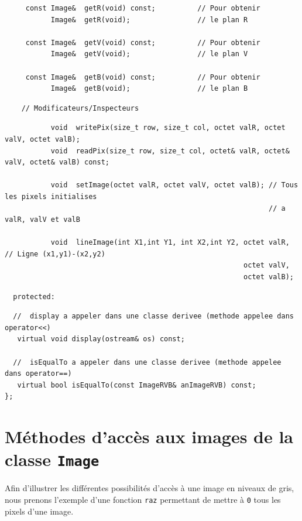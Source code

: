 \documentclass[12pt]{article}
\begin{document}
\begin{footnotesize}
\begin{verbatim}
     const Image&  getR(void) const;          // Pour obtenir
           Image&  getR(void);                // le plan R

     const Image&  getV(void) const;          // Pour obtenir
           Image&  getV(void);                // le plan V

     const Image&  getB(void) const;          // Pour obtenir
           Image&  getB(void);                // le plan B
\end{verbatim}
\vspace{-0.2cm}
\begin{verbatim}
    // Modificateurs/Inspecteurs
\end{verbatim}
\vspace{-0.2cm}
\begin{verbatim}
           void  writePix(size_t row, size_t col, octet valR, octet valV, octet valB);
           void  readPix(size_t row, size_t col, octet& valR, octet& valV, octet& valB) const;

           void  setImage(octet valR, octet valV, octet valB); // Tous les pixels initialises
                                                               // a valR, valV et valB

           void  lineImage(int X1,int Y1, int X2,int Y2, octet valR, // Ligne (x1,y1)-(x2,y2)
                                                         octet valV,
                                                         octet valB);
\end{verbatim}
\vspace{-0.2cm}
\begin{verbatim}
  protected:
\end{verbatim}
\vspace{-0.2cm}
\begin{verbatim}
  //  display a appeler dans une classe derivee (methode appelee dans operator<<)
   virtual void display(ostream& os) const;

  //  isEqualTo a appeler dans une classe derivee (methode appelee dans operator==)
   virtual bool isEqualTo(const ImageRVB& anImageRVB) const;
};
\end{verbatim}
\end{footnotesize}

\section{M\'ethodes d'acc\`es aux images de la classe {\tt Image}}

Afin d'illustrer les diff\'erentes possibilit\'es d'acc\`es \`a
une image en niveaux de gris, nous prenons l'exemple d'une fonction
{\tt raz} permettant de mettre \`a {\tt 0} tous les pixels d'une image.
\end{document}
